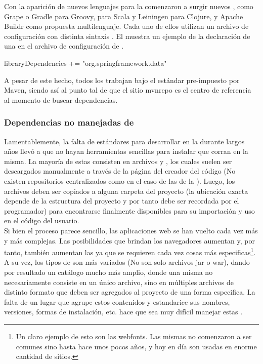 Con la aparición de nuevos lenguajes para la \jvm comenzaron a surgir nuevos
\depmgrs, como Grape o Gradle para Groovy, \sbt para Scala y
Leiningen para Clojure, y Apache Buildr como propuesta multilenguaje. Cada uno
de ellos utilizan un archivo de configuración con
distinta sintaxis . El
 muestra un ejemplo de
la declaración de una \dependency en el archivo de configuración de \sbt.
\\
\begin{javacode}[caption=Dependencia de SpringFramework 3.1.1 para \sbt,
	label=code:intro:jvm:sbt_module_add]
libraryDependencies += "org.springframework.data" %
\end{javacode}

A pesar de este hecho, todos los \depmgrs trabajan bajo el
estándar pre-impuesto por Maven, siendo así al punto tal de que el sitio
\gls{mvnrepo} es el centro de referencia al momento de buscar dependencias.

\subsubsection{Dependencias no manejadas de \viewtier}
\label{susubbsec:intro:jvm_dev:view_dependencies}

Lamentablemente, la falta de estándares para desarrollar \rias en la \viewtier 
durante largos años
llevó a que no hayan herramientas sencillas para instalar \dependencies que
corran en la misma. La mayoría de estas \dependencies consisten en archivos
\css y \js, los cuales suelen ser descargados manualmente a través de la
página del creador del código (No existen repositorios centralizados como
en el caso de las \dependencies de la \logictier). Luego, los archivos deben
ser copiados a alguna carpeta del proyecto (la ubicación exacta depende de
la estructura del proyecto y por tanto debe ser recordada por el programador)
para encontrarse finalmente disponibles para su importación y uso en el código
del usuario.\\
Si bien el proceso parece sencillo, las aplicaciones web se han vuelto cada
vez más y más complejas. Las posibilidades que brindan los navegadores aumentan
y, por tanto, también aumentan las \dependencies ya que se requieren cada vez
cosas más especificas\footnote{
	Un claro ejemplo de esto son las \gls{webfonts}. Las mismas
	no comenzaron a ser comunes sino hasta hace unos pocos años, y hoy en día
	son usadas en enorme cantidad de sitios.
}.\\
A su vez, los tipos de \dependency son más variados (No son solo archivos jar o war),
dando por resultado un catálogo mucho más amplio, donde una misma \dependency no
necesariamente consiste en un único archivo, sino en múltiples archivos de distinto
formato que deben ser agregados al proyecto de una forma especifica. La falta de un
lugar que agrupe
estos contenidos y estandarice sus nombres, versiones, formas de instalación, etc. hace que sea muy
difícil manejar estas \dependencies.

